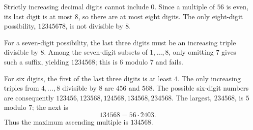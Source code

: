 Strictly increasing decimal digits cannot include $0$. Since a multiple of $56$ is even, its last digit is at most $8$, so there are at most eight digits. The only eight-digit possibility, $12345678$, is not divisible by $8$.

For a seven-digit possibility, the last three digits must be an increasing triple divisible by $8$. Among the seven-digit subsets of $1,\ldots,8$, only omitting $7$ gives such a suffix, yielding $1234568$; this is $6$ modulo $7$ and fails.

For six digits, the first of the last three digits is at least $4$. The only increasing triples from $4,\ldots,8$ divisible by $8$ are $456$ and $568$. The possible six-digit numbers are consequently $123456,123568,124568,134568,234568$. The largest, $234568$, is $5$ modulo $7$; the next is
\[
134568=56\cdot2403.
\]
Thus the maximum ascending multiple is $\boxed{134568}$.
